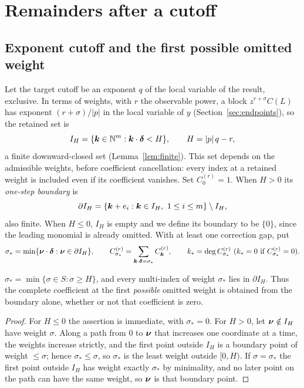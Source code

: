 \section{Remainders after a cutoff}
\label{sec:remainders}

\subsection{Exponent cutoff and the first possible omitted weight}

Let the target cutoff be an exponent $q$ of the local variable of the result, exclusive. In terms of weights, with $r$ the observable power, a block $z^{r+\sigma}C(L)$ has exponent $(r+\sigma)/|p|$ in the local variable of $y$ (Section~\ref{sec:endpoints}), so the retained set is
\begin{equation}
 I_H=\{\boldsymbol k\in\mathbb N^m:\boldsymbol k\cdot\boldsymbol\delta<H\},\qquad H=|p|\,q-r ,
 \label{eq:IH}
\end{equation}
a finite downward-closed set (Lemma~\ref{lem:finite}). This set depends on
the admissible weights, before coefficient cancellation: every index at a
retained weight is included even if its coefficient vanishes. Set
$C^{(r)}_0=1$. When $H>0$ its \emph{one-step boundary} is
\begin{equation}
 \partial I_H=\{\boldsymbol k+e_i:\boldsymbol k\in I_H,\ 1\le i\le m\}\setminus I_H ,
 \label{eq:boundary}
\end{equation}
also finite. When $H\le0$, $I_H$ is empty and we define its boundary to be $\{0\}$, since the leading monomial is already omitted. With at least one correction gap, put
\begin{equation}
 \sigma_*=\min\{\boldsymbol\nu\cdot\boldsymbol\delta:\boldsymbol\nu\in\partial I_H\},\qquad
 C^{(r)}_{\sigma_*}=\sum_{\boldsymbol k\cdot\boldsymbol\delta=\sigma_*}C^{(r)}_{\boldsymbol k},\qquad k_*=\deg C^{(r)}_{\sigma_*}\ (k_*=0\text{ if }C^{(r)}_{\sigma_*}=0).
 \label{eq:frontier-data}
\end{equation}

\begin{lemma}
\label{lem:frontier}
$\sigma_*=\min\{\sigma\in S:\sigma\ge H\}$, and every multi-index
of weight $\sigma_*$ lies in $\partial I_H$. Thus the complete coefficient
at the first \emph{possible} omitted weight is obtained from the boundary
alone, whether or not that coefficient is zero.
\end{lemma}
\begin{proof}
For $H\le0$ the assertion is immediate, with $\sigma_*=0$. For $H>0$, let $\boldsymbol\nu\notin I_H$ have weight $\sigma$. Along a path from $0$ to $\boldsymbol\nu$ that increases one coordinate at a time, the weights increase strictly, and the first point outside $I_H$ is a boundary point of weight $\le\sigma$; hence $\sigma_*\le\sigma$, so $\sigma_*$ is the least weight outside $[0,H)$. If $\sigma=\sigma_*$ the first point outside $I_H$ has weight exactly $\sigma_*$ by minimality, and no later point on the path can have the same weight, so $\boldsymbol\nu$ is that boundary point.
\end{proof}

